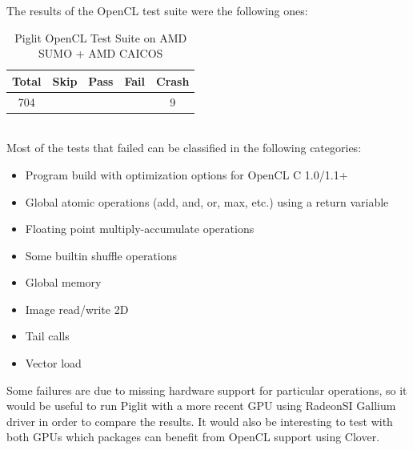 \documentclass[12pt,a4paper,oneside]{article}
\begin{document}
The results of the OpenCL test suite were the following ones:
\begin{table}[h!]
  \begin{center}
    \caption{Piglit OpenCL Test Suite on AMD SUMO + AMD CAICOS}
    \label{tab:piglit_opencl}
    \begin{tabular}{c|c|c|c|c}
    Total & Skip & Pass & Fail & Crash \\
    \hline
    704 & \color{blue}{94} & \color{green}{541} & \color{red}{60} & 9
    \end{tabular}
  \end{center}
\end{table}\\
Most of the tests that failed can be classified in the following categories:
\begin{itemize}
  \item Program build with optimization options for OpenCL C 1.0/1.1+
  \item Global atomic operations (add, and, or, max, etc.) using a return variable
  \item Floating point multiply-accumulate operations
  \item Some builtin shuffle operations
  \item Global memory
  \item Image read/write 2D
  \item Tail calls
  \item Vector load
\end{itemize}
Some failures are due to missing hardware support for particular operations, so
it would be useful to run Piglit with a more recent GPU using RadeonSI Gallium
driver in order to compare the results. It would also be interesting to test
with both GPUs which packages can benefit from OpenCL support using Clover.
\end{document}
